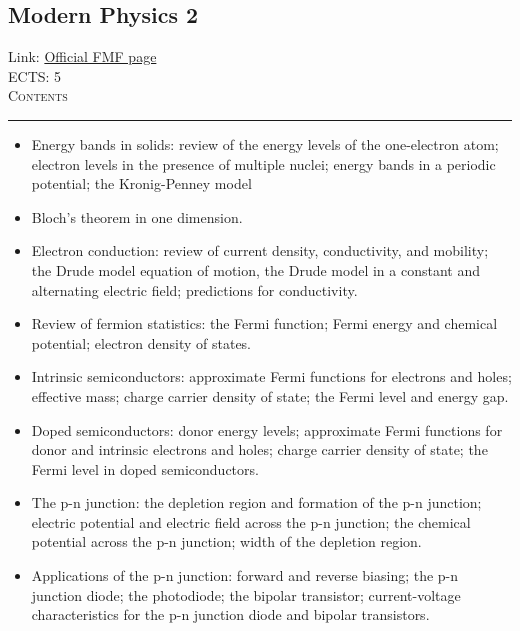\documentclass[11pt, a4paper]{article}
\newenvironment{course}[3]{
\subsection{#1}%
Link: \href{#2}{Official FMF page}\\%
ECTS: #3%
\vspace{1ex}
\\
{\large \textsc{Contents}}\\[-0.9ex]%
\rule{\textwidth}{0.5pt}
\vspace{-3ex}
}
{}
\newenvironment{chapter}[1]{
\begin{tcolorbox}[title=#1, breakable]
}
{\end{tcolorbox}}
\begin{document}
\begin{course}{Modern Physics 2}{https://www.fmf.uni-lj.si/en/study-physics/programmes/1fiz/2020/7000777/courses/1162/}{5}
    \label{modern-physics-2}

    \begin{chapter}{Introduction to solid state physics}
        \begin{itemize}
        
            \item Energy bands in solids: review of the energy levels of the one-electron atom; electron levels in the presence of multiple nuclei; energy bands in a periodic potential; the Kronig-Penney model

            \item Bloch's theorem in one dimension.

            \item Electron conduction:  review of current density, conductivity, and mobility; the Drude model equation of motion, the Drude model in a constant and alternating electric field; predictions for conductivity.

            \item Review of fermion statistics: the Fermi function; Fermi energy and chemical potential; electron density of states.

            \item Intrinsic semiconductors: approximate Fermi functions for electrons and holes; effective mass; charge carrier density of state; the Fermi level and energy gap.
            \item Doped semiconductors: donor energy levels; approximate Fermi functions for donor and intrinsic electrons and holes; charge carrier density of state; the Fermi level in doped semiconductors.

            \item The p-n junction: the depletion region and formation of the p-n junction; electric potential and electric field across the p-n junction; the chemical potential across the p-n junction; width of the depletion region.

            \item Applications of the p-n junction: forward and reverse biasing; the p-n junction diode; the photodiode; the bipolar transistor; current-voltage characteristics for the p-n junction diode and bipolar transistors.

        \end{itemize}
        

\end{chapter}
\end{course}
\end{document}
